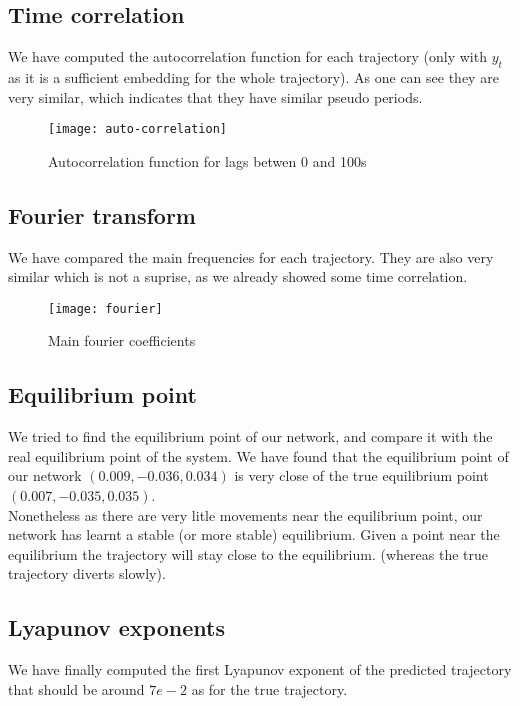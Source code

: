 \documentclass{article}
\begin{document}
\subsection{Time correlation}
We have computed the autocorrelation function for each trajectory (only with $y_t$ as it is a sufficient embedding for the whole trajectory).
As one can see they are very similar, which indicates that they have similar pseudo periods.

\begin{figure}[h!]
    \centering
    \texttt{[image: auto-correlation]}
    \caption{Autocorrelation function for lags betwen 0 and 100s}
    \label{fig:autocorrelation}
\end{figure}

\subsection{Fourier transform}
We have compared the main frequencies for each trajectory. They are also very similar which is not a suprise, as we already showed some
time correlation.

\begin{figure}[h!]
    \centering
    \texttt{[image: fourier]}
    \caption{Main fourier coefficients}
    \label{fig:fourier}
\end{figure}

\subsection{Equilibrium point}
We tried to find the equilibrium point of our network, and compare it with the real equilibrium point of the system. We have found that the equilibrium
point of our network $(0.009, -0.036, 0.034)$ is very close of the true equilibrium point $(0.007, -0.035, 0.035)$.\\
Nonetheless as there are very litle movements near the equilibrium point, our network has learnt a stable (or more stable) equilibrium.
Given a point near the equilibrium the trajectory will stay close to the equilibrium. (whereas the true trajectory diverts slowly).

\subsection{Lyapunov exponents}
We have finally computed the first Lyapunov exponent of the predicted trajectory that should be around $7e-2$ as for the true trajectory.
\end{document}
